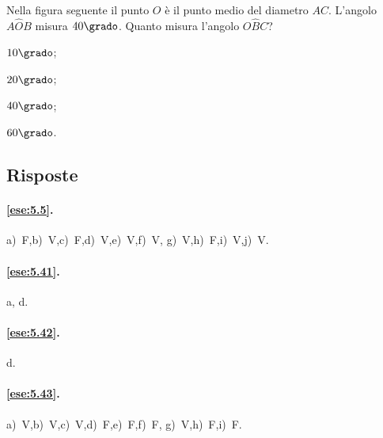 \noindent\begin{minipage}{0.65\textwidth}\parindent15pt
\begin{esercizio}
\label{ese:5.68}
Nella figura seguente il punto $O$ è il punto medio del diametro 
$AC$. L'angolo $A\widehat{O}B$ misura $40\grado$. Quanto misura 
l'angolo $O\widehat{B}C$? 
\begin{multicols}{4}
\begin{enumeratea}
\item $10\grado$;
\item $20\grado$;
\item $40\grado$;
\item $60\grado$.
\end{enumeratea}
\end{multicols}
\end{esercizio}
\end{minipage}\hfil
\begin{minipage}{0.35\textwidth}
	\centering
\end{minipage}\vspace{5pt}


\subsection{Risposte}

\begingroup
\hypersetup{linkcolor=black}

\paragraph{\ref{ese:5.5}.}
a)~F,\quad b)~V,\quad c)~F,\quad d)~V,\quad e)~V,\quad f)~V,\quad 
g)~V,\quad h)~F,\quad i)~V,\quad j)~V.

\paragraph{\ref{ese:5.41}.}
a, d.

\paragraph{\ref{ese:5.42}.}
d.

\paragraph{\ref{ese:5.43}.}
a)~V,\quad b)~V,\quad c)~V,\quad d)~F,\quad e)~F,\quad f)~F,\quad 
g)~V,\quad h)~F,\quad i)~F.

